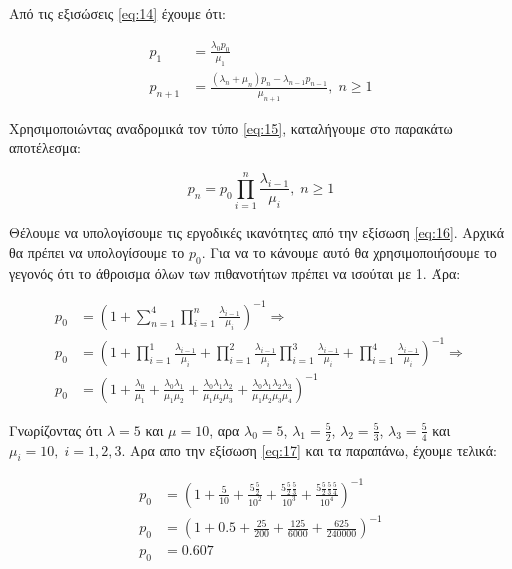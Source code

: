 \documentclass {article}
\begin{document}
Από τις εξισώσεις \ref{eq:14} έχουμε ότι:

\begin{equation}\label{eq:15}
	\begin{split}
		p_1 & = \frac{λ_0p_0}{μ_1}\\
		p_{n+1} & = \frac{(λ_n + μ_n)p_n - λ_{n-1}p_{n-1}}{μ_{n+1}},\; n \geq 1
	\end{split}
\end{equation}

Χρησιμοποιώντας αναδρομικά τον τύπο \ref{eq:15}, καταλήγουμε στο παρακάτω αποτέλεσμα:

\begin{equation}\label{eq:16}
	p_n = p_0 \prod_{i=1}^{n}{\frac{λ_{i-1}}{μ_i}},\; n \geq 1
\end{equation}

Θέλουμε να υπολογίσουμε τις εργοδικές ικανότητες από την εξίσωση \ref{eq:16}. Αρχικά θα πρέπει να υπολογίσουμε το $p_0$. Για να το κάνουμε αυτό θα χρησιμοποιήσουμε το γεγονός ότι το άθροισμα όλων των πιθανοτήτων πρέπει να ισούται με 1. Άρα:

\begin{equation}
	\begin{split}		
	p_0 & = \left(1 + \sum_{n=1}^{4}{\prod_{i=1}^{n}{\frac{λ_{i-1}}{μ_i}}} \right)^{-1} \Rightarrow\\
	p_0 & = \left(1 + \prod_{i=1}^{1}{\frac{λ_{i-1}}{μ_i}} 
	+ \prod_{i=1}^{2}{\frac{λ_{i-1}}{μ_i}} \prod_{i=1}^{3}{\frac{λ_{i-1}}{μ_i}} + \prod_{i=1}^{4}{\frac{λ_{i-1}}{μ_i}}\right)^{-1} \Rightarrow\\
	p_0 & = \left(1 + \frac{λ_0}{μ_1} + \frac{λ_0 λ_1}{μ_1 μ_2} +
	 \frac{λ_0 λ_1 λ_2}{μ_1 μ_2 μ_3}  + \frac{λ_0 λ_1 λ_2 λ_3}{μ_1 μ_2 μ_3 μ_4} \right)^{-1} \label{eq:17}
\end{split}
\end{equation}

Γνωρίζοντας ότι $λ = 5$ και $μ = 10$, αρα $λ_0 = 5$, $λ_1 = \frac{5}{2}$, $λ_2 = \frac{5}{3}$, $λ_3 = \frac{5}{4}$ και $ μ_i = 10,\; i = 1, 2, 3$. Αρα απο την εξίσωση \ref{eq:17} και τα παραπάνω, έχουμε τελικά:

\begin{equation}
	\begin{split}
		p_0 & = \left(1 + \frac{5}{10} + \frac{5 \frac{5}{2}}{10^2} +
			 \frac{5 \frac{5}{2} \frac{5}{3}}{10^3} +
			 \frac{5 \frac{5}{2} \frac{5}{3} \frac{5}{4}}{10^4}\right)^{-1} \\
		p_0 & = \left(1 + 0.5 + \frac{25}{200} + \frac{125}{6000} + 
		\frac{625}{240000}\right)^{-1}\\
		p_0 & = 0.607 \label{eq:18}
	\end{split}
\end{equation}
\end{document}
